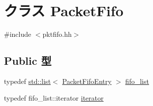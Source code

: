 \hypertarget{classPacketFifo}{
\section{クラス PacketFifo}
\label{classPacketFifo}
}


{\ttfamily \#include $<$pktfifo.hh$>$}\subsection*{Public 型}
\begin{DoxyCompactItemize}
\item 
typedef \hyperlink{classstd_1_1list}{std::list}$<$ \hyperlink{structPacketFifoEntry}{PacketFifoEntry} $>$ \hyperlink{classPacketFifo_a8ef5de3fd8fcb3e4544652034a023572}{fifo\_\-list}
\item 
typedef fifo\_\-list::iterator \hyperlink{classPacketFifo_a6905b6d8863a2eecd86b633802b68fda}{iterator}
\end{DoxyCompactItemize}

